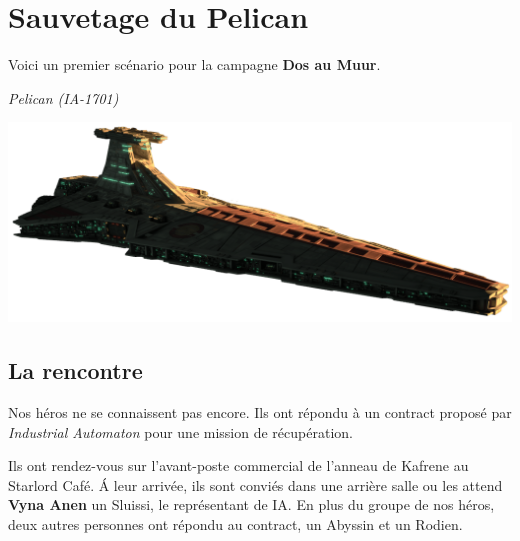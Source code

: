 \section{Sauvetage du Pelican}

Voici un premier scénario pour la campagne \textbf{Dos au Muur}. 

\vspace{2\baselineskip}
\begin{flushright}
	\emph{Pelican (IA-1701)}
\end{flushright}

\vspace{-6\baselineskip}

\hspace{-0.4\columnsep}\includegraphics[width=\textwidth]{_img/dos-au-muur/venator.png}
\vspace{-7\baselineskip}

\subsection{La rencontre}
Nos héros ne se connaissent pas encore. Ils ont répondu à un contract proposé par \emph{Industrial Automaton} pour une mission de récupération.

Ils ont rendez-vous sur l’avant-poste commercial de l’anneau de Kafrene au Starlord Café. \'A leur arrivée, ils sont conviés dans une arrière salle ou les attend \textbf{Vyna Anen} un Sluissi, le représentant de IA. En plus du groupe de nos héros, deux autres personnes ont répondu au contract, un Abyssin et un Rodien.

